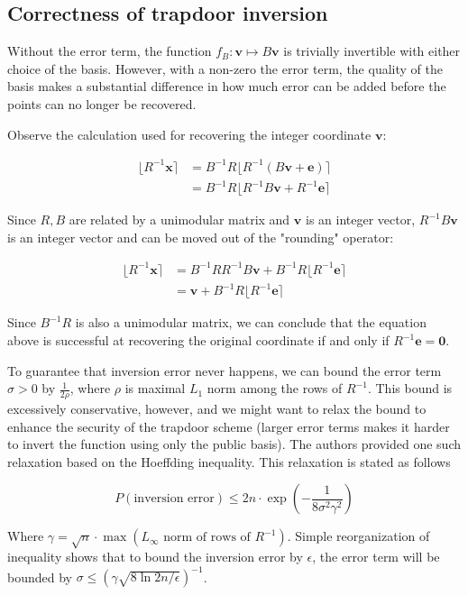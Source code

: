 \documentclass[letterpaper,12pt]{article}
\begin{document}
\subsection{Correctness of trapdoor inversion}
Without the error term, the function $f_B: \mathbf{v} \mapsto B\mathbf{v}$ is trivially invertible with either choice of the basis. However, with a non-zero the error term, the quality of the basis makes a substantial difference in how much error can be added before the points can no longer be recovered.

Observe the calculation used for recovering the integer coordinate $\mathbf{v}$:

$$
\begin{aligned}
\lfloor R^{-1}\mathbf{x} \rceil &= B^{-1}R\lfloor R^{-1}(B\mathbf{v} + \mathbf{e})\rceil \\
&= B^{-1}R\lfloor R^{-1}B\mathbf{v} + R^{-1}\mathbf{e}\rceil
\end{aligned}
$$

Since $R, B$ are related by a unimodular matrix and $\mathbf{v}$ is an integer vector, $R^{-1}B\mathbf{v}$ is an integer vector and can be moved out of the "rounding" operator:

$$
\begin{aligned}
\lfloor R^{-1}\mathbf{x} \rceil &= B^{-1}RR^{-1}B\mathbf{v} + B^{-1}R\lfloor R^{-1}\mathbf{e}\rceil \\
&= \mathbf{v} + B^{-1}R\lfloor R^{-1}\mathbf{e} \rceil
\end{aligned}
$$

Since $B^{-1}R$ is also a unimodular matrix, we can conclude that the equation above is successful at recovering the original coordinate if and only if $R^{-1}\mathbf{e} = \mathbf{0}$.

To guarantee that inversion error never happens, we can bound the error term $\sigma > 0$ by $\frac{1}{2\rho}$, where $\rho$ is maximal $L_1$ norm among the rows of $R^{-1}$. This bound is excessively conservative, however, and we might want to relax the bound to enhance the security of the trapdoor scheme (larger error terms makes it harder to invert the function using only the public basis). The authors provided one such relaxation based on the Hoeffding inequality. This relaxation is stated as follows

$$
P(\text{inversion error}) \leq 2n \cdot \exp(-\frac{1}{8\sigma^2\gamma^2})
$$

Where $\gamma = \sqrt{n} \cdot \max(L_\infty \text{ norm of rows of } R^{-1})$. Simple reorganization of inequality shows that to bound the inversion error by $\epsilon$, the error term will be bounded by $\sigma \leq (\gamma\sqrt{8\ln{2n/\epsilon}})^{-1}$.
\end{document}
